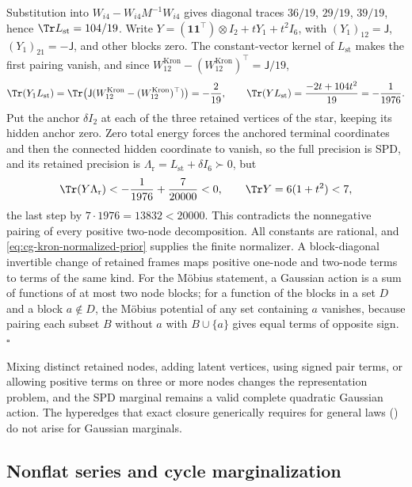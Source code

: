 Substitution into \(W_{i4}-W_{i4}M^{-1}W_{i4}\) gives diagonal traces
\(36/19\), \(29/19\), \(39/19\), hence \(\Tr L_{\mathrm{st}}=104/19\). Write
\(Y=(\mathbf1\mathbf1^\top)\otimes I_2+tY_1+t^2I_6\), with
\((Y_1)_{12}=\mathsf J\), \((Y_1)_{21}=-\mathsf J\), and other blocks zero. The
constant-vector kernel of \(L_{\mathrm{st}}\) makes the first pairing vanish,
and since
\(W^{\mathrm{Kron}}_{12}-(W^{\mathrm{Kron}}_{12})^\top=\mathsf J/19\),
\begin{equation}
\Tr(Y_1L_{\mathrm{st}})
=\Tr\bigl(\mathsf J(W^{\mathrm{Kron}}_{12}-(W^{\mathrm{Kron}}_{12})^\top)\bigr)=-\frac2{19},
\qquad
\Tr(YL_{\mathrm{st}})=\frac{-2t+104t^2}{19}=-\frac1{1976}.
\label{eq:cg-kron-negative-dual-pairing}
\end{equation}
Put the anchor \(\delta I_2\) at each of the three retained vertices of the
star, keeping its hidden anchor zero. Zero total energy forces the anchored
terminal coordinates and then the connected hidden coordinate to vanish, so the
full precision is SPD, and its retained precision is
\(\Lambda_{\mathrm r}=L_{\mathrm{st}}+\delta I_6\succ0\), but
\begin{equation}
\Tr(Y\Lambda_{\mathrm r})<-\frac1{1976}+\frac7{20000}<0,
\qquad
\Tr Y=6(1+t^2)<7,
\label{eq:cg-kron-proper-dual-obstruction}
\end{equation}
the last step by \(7\cdot1976=13832<20000\). This contradicts the nonnegative
pairing of every positive two-node decomposition. All constants are rational,
and \eqref{eq:cg-kron-normalized-prior} supplies the finite normalizer. A
block-diagonal invertible change of retained frames maps positive one-node and
two-node terms to terms of the same kind. For the M\"obius statement, a Gaussian
action is a sum of functions of at most two node blocks; for a function of the
blocks in a set \(D\) and a block \(a\notin D\), the M\"obius potential of any
set containing \(a\) vanishes, because pairing each subset \(B\) without \(a\)
with \(B\cup\{a\}\) gives equal terms of opposite sign. \(\square\)

Mixing distinct retained nodes, adding latent vertices, using signed pair terms,
or allowing positive terms on three or more nodes changes the representation
problem, and the SPD marginal remains a valid complete quadratic Gaussian
action. The hyperedges that exact closure generically requires for general laws
() do not arise for Gaussian marginals.

\subsection{Nonflat series and cycle marginalization}
\label{sec:cg-nonflat-series-kron}

